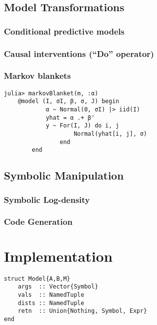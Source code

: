 \documentclass[anonymous=false, %
               format=acmsmall, %
               review=true, %
               screen=true, %
               nonacm=true]{acmart}
\begin{document}
\subsection{Model Transformations}


\subsubsection*{Conditional predictive models}




\subsubsection*{Causal interventions (``Do'' operator)}

\subsubsection*{Markov blankets}


\begin{verbatim}
julia> markovBlanket(m, :α)
    @model (I, σI, β, σ, J) begin
            α ~ Normal(0, σI) |> iid(I)
            yhat = α .+ β'
            y ~ For(I, J) do i, j
                    Normal(yhat[i, j], σ)
                end
        end 
\end{verbatim}


\subsection{Symbolic Manipulation}

\subsubsection*{Symbolic Log-density}

\subsubsection*{Code Generation}

\section{Implementation}

\begin{verbatim}
struct Model{A,B,M} 
    args  :: Vector{Symbol}
    vals  :: NamedTuple
    dists :: NamedTuple
    retn  :: Union{Nothing, Symbol, Expr}
end
\end{verbatim}
\end{document}
